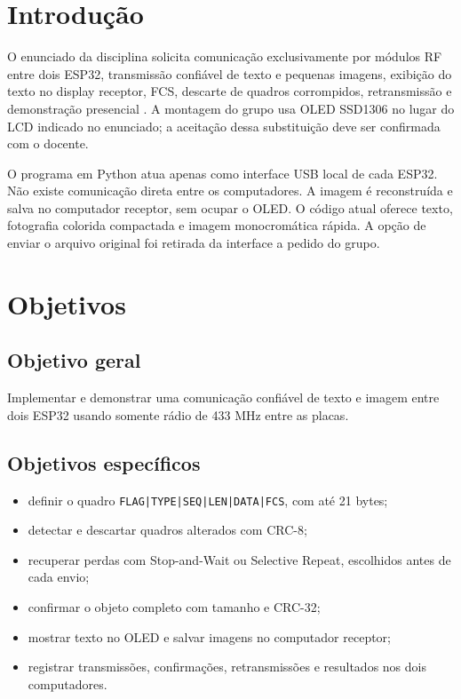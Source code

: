 \documentclass[12pt,a4paper]{article}
\begin{document}
\section{Introdução}
O enunciado da disciplina solicita comunicação exclusivamente por módulos RF entre dois ESP32, transmissão confiável de texto e pequenas imagens, exibição do texto no display receptor, FCS, descarte de quadros corrompidos, retransmissão e demonstração presencial \cite{projeto}. A montagem do grupo usa OLED SSD1306 no lugar do LCD indicado no enunciado; a aceitação dessa substituição deve ser confirmada com o docente.

O programa em Python atua apenas como interface USB local de cada ESP32. Não existe comunicação direta entre os computadores. A imagem é reconstruída e salva no computador receptor, sem ocupar o OLED. O código atual oferece texto, fotografia colorida compactada e imagem monocromática rápida. A opção de enviar o arquivo original foi retirada da interface a pedido do grupo.

\section{Objetivos}
\subsection{Objetivo geral}
Implementar e demonstrar uma comunicação confiável de texto e imagem entre dois ESP32 usando somente rádio de 433 MHz entre as placas.

\subsection{Objetivos específicos}
\begin{itemize}
\item definir o quadro \texttt{FLAG|TYPE|SEQ|LEN|DATA|FCS}, com até 21 bytes;
\item detectar e descartar quadros alterados com CRC-8;
\item recuperar perdas com Stop-and-Wait ou Selective Repeat, escolhidos antes de cada envio;
\item confirmar o objeto completo com tamanho e CRC-32;
\item mostrar texto no OLED e salvar imagens no computador receptor;
\item registrar transmissões, confirmações, retransmissões e resultados nos dois computadores.
\end{itemize}
\end{document}
